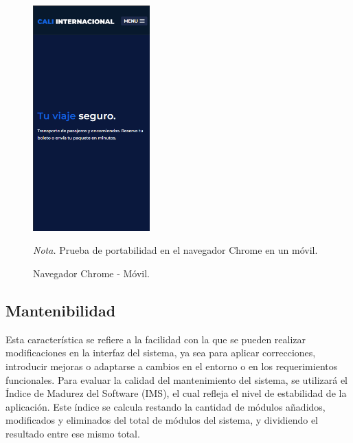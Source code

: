 \begin{figure}[!h] %
	\caption[Navegador Chrome - Móvil]
	{\newline Navegador Chrome - Móvil.} %
	\centering
	\includegraphics[width=0.4\textwidth]{imagenes/cap_3/celular.png} %
	
	\begin{flushleft}
		\hspace{1.20cm} \textit{Nota.} Prueba de portabilidad en el navegador Chrome en un móvil. %
	\end{flushleft}
	\vspace{-16pt}
	\label{fig:figura_celular} %
\end{figure}

\vspace{0.3cm} %

\subsection{Mantenibilidad}

	Esta característica se refiere a la facilidad con la que se pueden realizar modificaciones en la interfaz del sistema, ya sea para aplicar correcciones, introducir mejoras o adaptarse a cambios en el entorno o en los requerimientos funcionales. Para evaluar la calidad del mantenimiento del sistema, se utilizará el Índice de Madurez del Software (IMS), el cual refleja el nivel de estabilidad de la aplicación. Este índice se calcula restando la cantidad de módulos añadidos, modificados y eliminados del total de módulos del sistema, y dividiendo el resultado entre ese mismo total.
	
